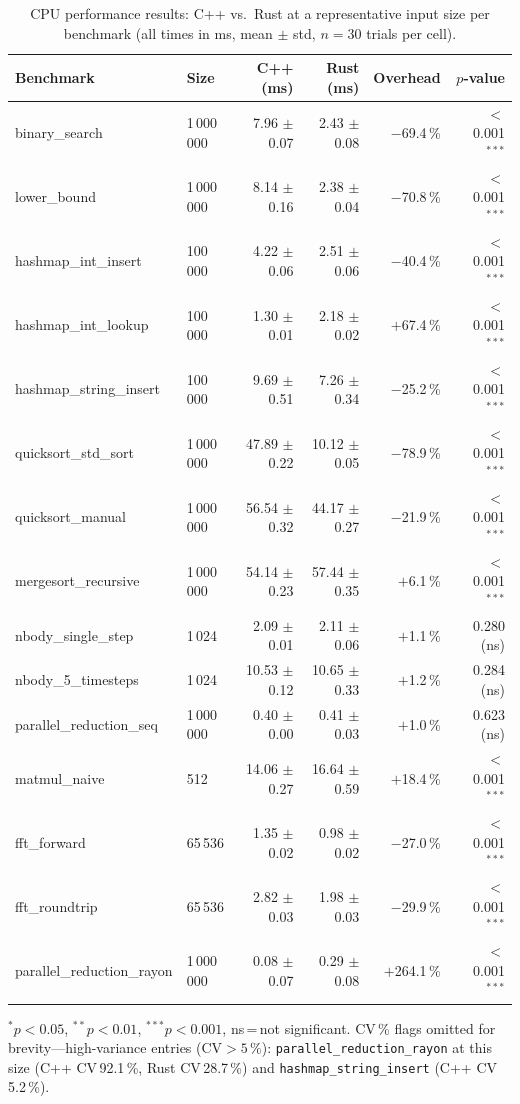 \documentclass{article}
\begin{document}
\begin{table}[htbp]
\caption{CPU performance results: C++ vs.\ Rust at a representative input
         size per benchmark (all times in ms, mean $\pm$ std,
         $n=30$ trials per cell).}
\label{tab:cpu_results}
\centering
\begin{tabular}{llrrrr}
\toprule
Benchmark & Size & C++ (ms) & Rust (ms) & Overhead & $p$-value \\
\midrule
binary\_search           & 1\,000\,000 & 7.96 $\pm$ 0.07 & 2.43 $\pm$ 0.08 & $-$69.4\,\% & $<$0.001$^{***}$ \\
lower\_bound             & 1\,000\,000 & 8.14 $\pm$ 0.16 & 2.38 $\pm$ 0.04 & $-$70.8\,\% & $<$0.001$^{***}$ \\
hashmap\_int\_insert     & 100\,000   & 4.22 $\pm$ 0.06 & 2.51 $\pm$ 0.06 & $-$40.4\,\% & $<$0.001$^{***}$ \\
hashmap\_int\_lookup     & 100\,000   & 1.30 $\pm$ 0.01 & 2.18 $\pm$ 0.02 & $+$67.4\,\% & $<$0.001$^{***}$ \\
hashmap\_string\_insert  & 100\,000   & 9.69 $\pm$ 0.51 & 7.26 $\pm$ 0.34 & $-$25.2\,\% & $<$0.001$^{***}$ \\
quicksort\_std\_sort     & 1\,000\,000 & 47.89 $\pm$ 0.22 & 10.12 $\pm$ 0.05 & $-$78.9\,\% & $<$0.001$^{***}$ \\
quicksort\_manual        & 1\,000\,000 & 56.54 $\pm$ 0.32 & 44.17 $\pm$ 0.27 & $-$21.9\,\% & $<$0.001$^{***}$ \\
mergesort\_recursive     & 1\,000\,000 & 54.14 $\pm$ 0.23 & 57.44 $\pm$ 0.35 & $+$6.1\,\% & $<$0.001$^{***}$ \\
nbody\_single\_step      & 1\,024     & 2.09 $\pm$ 0.01 & 2.11 $\pm$ 0.06 & $+$1.1\,\% & 0.280 (ns) \\
nbody\_5\_timesteps      & 1\,024     & 10.53 $\pm$ 0.12 & 10.65 $\pm$ 0.33 & $+$1.2\,\% & 0.284 (ns) \\
parallel\_reduction\_seq & 1\,000\,000 & 0.40 $\pm$ 0.00 & 0.41 $\pm$ 0.03 & $+$1.0\,\% & 0.623 (ns) \\
matmul\_naive            & 512        & 14.06 $\pm$ 0.27 & 16.64 $\pm$ 0.59 & $+$18.4\,\% & $<$0.001$^{***}$ \\
fft\_forward             & 65\,536    & 1.35 $\pm$ 0.02 & 0.98 $\pm$ 0.02 & $-$27.0\,\% & $<$0.001$^{***}$ \\
fft\_roundtrip           & 65\,536    & 2.82 $\pm$ 0.03 & 1.98 $\pm$ 0.03 & $-$29.9\,\% & $<$0.001$^{***}$ \\
parallel\_reduction\_rayon & 1\,000\,000 & 0.08 $\pm$ 0.07 & 0.29 $\pm$ 0.08 & $+$264.1\,\% & $<$0.001$^{***}$ \\
\bottomrule
\end{tabular}
{\small $^{*}p<0.05$, $^{**}p<0.01$, $^{***}p<0.001$, ns\,=\,not significant.
 CV\,\% flags omitted for brevity---high-variance entries
 ($\text{CV}>5\,\%$): \texttt{parallel\_reduction\_rayon} at this size
 (C++ CV\,92.1\,\%, Rust CV\,28.7\,\%) and \texttt{hashmap\_string\_insert}
 (C++ CV\,5.2\,\%).}
\end{table}
\end{document}
